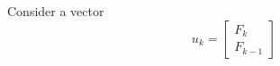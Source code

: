 \documentclass[preview]{standalone}
\begin{document}
\begin{center}
Consider a vector $$u_k = \begin{bmatrix} F_k \\ F_{k - 1} \end{bmatrix}$$
\end{center}
\end{document}
